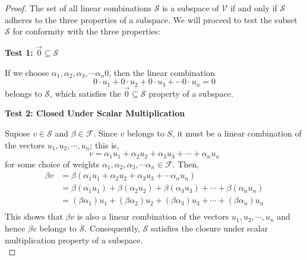 \documentclass{book}
\theoremstyle{definition}
\theoremstyle{remark}
\newcommand{\cc}[1]{\mathcal{#1}}
\newcommand{\m}{\cdot}
\begin{document}
\begin{proof}
    The set of all linear combinations $\cc{S}$ is a subspace of $\cc{V}$ if and only if $\cc{S}$ adheres to the three properties of a subspace. We will proceed to test the subset $\cc{S}$ for conformity with the three properties: \\
    
        \begin{flushleft} \textbf{Test 1: $\vec{0} \subseteq \cc{S}$} \end{flushleft}
            If we choose $\alpha_1, \alpha_2, \alpha_3, \cdots \alpha_n 0$, then the linear combination
                \begin{equation*}
                    0 \m u_1 + 0 \m u_2 + 0 \m u_3 + \cdots 0 \m u_n = 0 
                \end{equation*}
            belongs to $\cc{S}$, which satisfies the $\vec{0} \subseteq \cc{S}$ property of a subspace. \\
        
        \begin{flushleft} \textbf{Test 2: Closed Under Scalar Multiplication} \end{flushleft}        
            Supose $v \in \cc{S}$ and $\beta \in \cc{F}$. Since $v$ belongs to $S$, it must be a linear combination of the vectors $u_1, u_2, \cdots, u_n$; this is, 
                \begin{equation*}
                    v = \alpha_1 u_1 + \alpha_2 u_2 + \alpha_3 u_3 + \cdots + \alpha_n u_n
                \end{equation*}
            for some choice of weights $\alpha_1, \alpha_2, \alpha_3, \cdots \alpha_n \in \cc{F}$. Then, 
                \begin{align*}
                    \beta v & = \beta (\alpha_1 u_1 + \alpha_2 u_2 + \alpha_3 u_3 + \cdots \alpha_n u_n) \\
                        & = \beta (\alpha_1 u_1) + \beta (\alpha_2 u_2) + \beta (\alpha_3 u_3) + \cdots + \beta (\alpha_n u_n) \\
                        & = (\beta \alpha_1) u_1 + (\beta \alpha_2) u_2 + (\beta \alpha_3) u_3 + \cdots + (\beta \alpha_n) u_n \\                        
                \end{align*}
            This shows that $\beta v$ is also a linear combination of the vectors $u_1, u_2, \cdots, u_n$ and hence $\beta v$ belongs to $\cc{S}$. Consequently, $\cc{S}$ satisfies the closure under scalar multiplication property of a subspace. \\
        

\end{proof}
\end{document}
